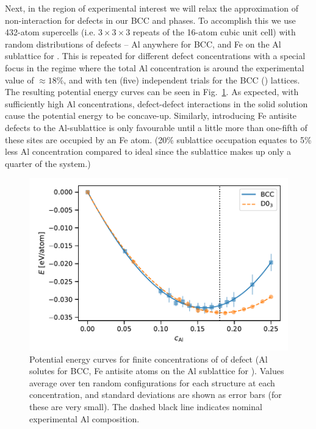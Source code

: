 Next, in the region of experimental interest we will relax the approximation of non-interaction for defects in our BCC and \DOTHREE phases.
To accomplish this we use 432-atom supercells (i.e. $3\times3\times3$ repeats of the 16-atom cubic \DOTHREE unit cell) with random distributions of defects -- Al anywhere for BCC, and Fe on the Al sublattice for \DOTHREE.
This is repeated for different defect concentrations with a special focus in the regime where the total Al concentration is around the experimental value of $\approx 18\%$, and with ten (five) independent trials for the BCC (\DOTHREE) lattices.
The resulting potential energy curves can be seen in Fig.~\ref{fig:0K_interacting_potential}.
As expected, with sufficiently high Al concentrations, defect-defect interactions in the solid solution cause the potential energy to be concave-up.
Similarly, introducing Fe antisite defects to the \DOTHREE Al-sublattice is only favourable until a little more than one-fifth of these sites are occupied by an Fe atom. (20\% sublattice occupation equates to 5\% less Al concentration compared to ideal \DOTHREE since the sublattice makes up only a quarter of the system.)
%
\begin{figure}[h]
    \centering
    \includegraphics[width=\textwidth]{figures/zerok_interacting_defect_potential}
    \caption{Potential energy curves for finite concentrations of of defect (Al solutes for BCC, Fe antisite atoms on the Al sublattice for \DOTHREE). Values average over ten random configurations for each structure at each concentration, and standard deviations are shown as error bars (for \DOTHREE these are very small). The dashed black line indicates nominal experimental Al composition.}
    \label{fig:0K_interacting_potential}
\end{figure}
%

